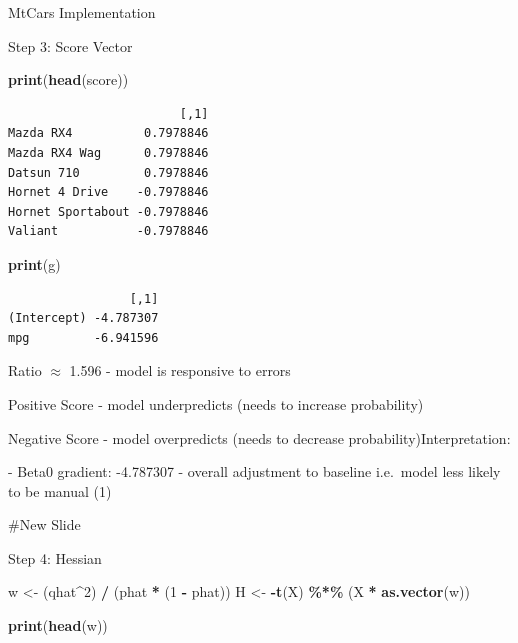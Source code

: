 \documentclass[
  ignorenonframetext,
]{beamer}
\newenvironment{Shaded}{\begin{snugshade}}{\end{snugshade}}
\newcommand{\DecValTok}[1]{\textcolor[rgb]{0.00,0.00,0.81}{#1}}
\newcommand{\FunctionTok}[1]{\textcolor[rgb]{0.13,0.29,0.53}{\textbf{#1}}}
\newcommand{\NormalTok}[1]{#1}
\newcommand{\OtherTok}[1]{\textcolor[rgb]{0.56,0.35,0.01}{#1}}
\newcommand{\SpecialCharTok}[1]{\textcolor[rgb]{0.81,0.36,0.00}{\textbf{#1}}}
\begin{document}
\begin{frame}[fragile]{MtCars Implementation}
\begin{block}{Step 3: Score Vector}
\begin{Shaded}
\begin{Highlighting}[]
\FunctionTok{print}\NormalTok{(}\FunctionTok{head}\NormalTok{(score))}
\end{Highlighting}
\end{Shaded}

\begin{verbatim}
                        [,1]
Mazda RX4          0.7978846
Mazda RX4 Wag      0.7978846
Datsun 710         0.7978846
Hornet 4 Drive    -0.7978846
Hornet Sportabout -0.7978846
Valiant           -0.7978846
\end{verbatim}

\begin{Shaded}
\begin{Highlighting}[]
\FunctionTok{print}\NormalTok{(g)}
\end{Highlighting}
\end{Shaded}

\begin{verbatim}
                 [,1]
(Intercept) -4.787307
mpg         -6.941596
\end{verbatim}

Ratio \(\approx\) 1.596 - model is responsive to errors

Positive Score - model underpredicts (needs to increase probability)

Negative Score - model overpredicts (needs to decrease
probability)Interpretation:

- Beta0 gradient: -4.787307 - overall adjustment to baseline i.e.~model
less likely to be manual (1)

\#New Slide
\end{block}

\begin{block}{Step 4: Hessian}
\protect{}\label{step-4-hessian-1}
\begin{Shaded}
\begin{Highlighting}[]
\NormalTok{w }\OtherTok{\textless{}{-}}\NormalTok{ (qhat}\SpecialCharTok{\^{}}\DecValTok{2}\NormalTok{) }\SpecialCharTok{/}\NormalTok{ (phat }\SpecialCharTok{*}\NormalTok{ (}\DecValTok{1} \SpecialCharTok{{-}}\NormalTok{ phat))}
\NormalTok{H }\OtherTok{\textless{}{-}} \SpecialCharTok{{-}}\FunctionTok{t}\NormalTok{(X) }\SpecialCharTok{\%*\%}\NormalTok{ (X }\SpecialCharTok{*} \FunctionTok{as.vector}\NormalTok{(w))}

\FunctionTok{print}\NormalTok{(}\FunctionTok{head}\NormalTok{(w))}
\end{Highlighting}
\end{Shaded}


\end{block}
\end{frame}
\end{document}
